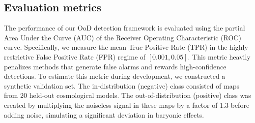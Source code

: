 \documentclass[]{article}
\begin{document}
\subsection{Evaluation metrics}
The performance of our OoD detection framework is evaluated using the partial Area Under the Curve (AUC) of the Receiver Operating Characteristic (ROC) curve. Specifically, we measure the mean True Positive Rate (TPR) in the highly restrictive False Positive Rate (FPR) regime of $[0.001, 0.05]$. This metric heavily penalizes methods that generate false alarms and rewards high-confidence detections. To estimate this metric during development, we constructed a synthetic validation set. The in-distribution (negative) class consisted of maps from 20 held-out cosmological models. The out-of-distribution (positive) class was created by multiplying the noiseless signal in these maps by a factor of 1.3 before adding noise, simulating a significant deviation in baryonic effects.
\end{document}
